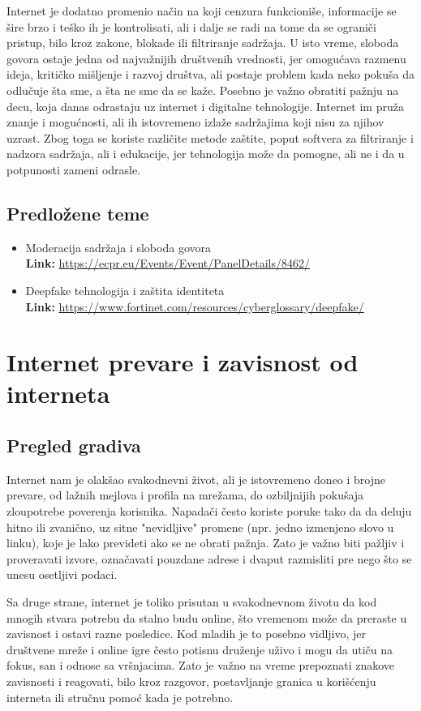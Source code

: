 \documentclass[a4paper,12pt]{article}
\begin{document}
Internet je dodatno promenio način na koji cenzura funkcioniše, informacije se šire brzo i teško ih je kontrolisati, ali i dalje se radi na tome da se ograniči pristup, bilo kroz zakone, blokade ili filtriranje sadržaja. U isto vreme, sloboda govora ostaje jedna od najvažnijih društvenih vrednosti, jer omogućava razmenu ideja, kritičko mišljenje i razvoj društva, ali postaje problem kada neko pokuša da odlučuje šta sme, a šta ne sme da se kaže.
Posebno je važno obratiti pažnju na decu, koja danas odrastaju uz internet i digitalne tehnologije. Internet im pruža znanje i mogućnosti, ali ih istovremeno izlaže sadržajima koji nisu za njihov uzrast. Zbog toga se koriste različite metode zaštite, poput softvera za filtriranje i nadzora sadržaja, ali i edukacije, jer tehnologija može da pomogne, ali ne i da u potpunosti zameni odrasle.

\subsection{Predložene teme}
\begin{itemize}
  \item Moderacija sadržaja i sloboda govora \\
  \textbf{Link:} \url{https://ecpr.eu/Events/Event/PanelDetails/8462/}
  \item Deepfake tehnologija i zaštita identiteta \\
  \textbf{Link:} \url{https://www.fortinet.com/resources/cyberglossary/deepfake/}
\end{itemize}

\section{Internet prevare i zavisnost od interneta}
\subsection{Pregled gradiva}
Internet nam je olakšao svakodnevni život, ali je istovremeno doneo i brojne prevare, od lažnih mejlova i profila na mrežama, do ozbiljnijih pokušaja zloupotrebe poverenja korisnika. Napadači često koriste poruke tako da da deluju hitno ili zvanično, uz sitne "nevidljive" promene (npr. jedno izmenjeno slovo u linku), koje je lako prevideti ako se ne obrati pažnja. Zato je važno biti pažljiv i proveravati izvore, označavati pouzdane adrese i dvaput razmisliti pre nego što se unesu osetljivi podaci.

Sa druge strane, internet je toliko prisutan u svakodnevnom životu da kod mnogih stvara potrebu da stalno budu online, što vremenom može da preraste u zavisnost i ostavi razne posledice. Kod mladih je to posebno vidljivo, jer društvene mreže i online igre često potisnu druženje uživo i mogu da utiču na fokus, san i odnose sa vršnjacima. Zato je važno na vreme prepoznati znakove zavisnosti i reagovati, bilo kroz razgovor, postavljanje granica u korišćenju interneta ili stručnu pomoć kada je potrebno.
\end{document}
